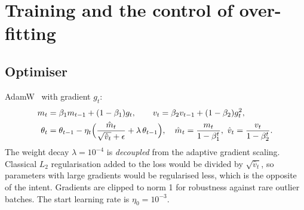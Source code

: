 \documentclass[11pt,a4paper]{article}
\begin{document}
\section{Training and the control of over-fitting}\label{sec:training}
\subsection{Optimiser}
AdamW~\cite{loshchilov2019} with gradient $g_t$:
\begin{align}
m_t&=\beta_1m_{t-1}+(1-\beta_1)g_t,\qquad v_t=\beta_2v_{t-1}+(1-\beta_2)g_t^2,\\
\theta_t&=\theta_{t-1}-\eta_t\Bigl(\frac{\hat m_t}{\sqrt{\hat v_t}+\epsilon}+\lambda\,\theta_{t-1}\Bigr),\quad \hat m_t=\frac{m_t}{1-\beta_1^t},\ \hat v_t=\frac{v_t}{1-\beta_2^t}.
\end{align}
The weight decay $\lambda=10^{-4}$ is \emph{decoupled} from the adaptive gradient scaling. Classical $L_2$ regularisation added to the loss would be divided by $\sqrt{\hat v_t}$, so parameters with large gradients would be regularised less, which is the opposite of the intent. Gradients are clipped to norm 1 for robustness against rare outlier batches. The start learning rate is $\eta_0=10^{-3}$.
\end{document}
